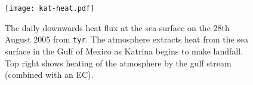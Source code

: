 
\begin{figure}
\texttt{[image: kat-heat.pdf]}
\caption{The daily downwards heat flux at the sea surface on the 28th August 2005
       from \texttt{tyr}.
       The atmosphere extracts heat from the sea surface
       in the Gulf of Mexico as Katrina
       begins to make landfall. Top right shows heating of the atmosphere by
       the gulf stream (combined with an EC). }
\label{fig:heat}
\end{figure}
